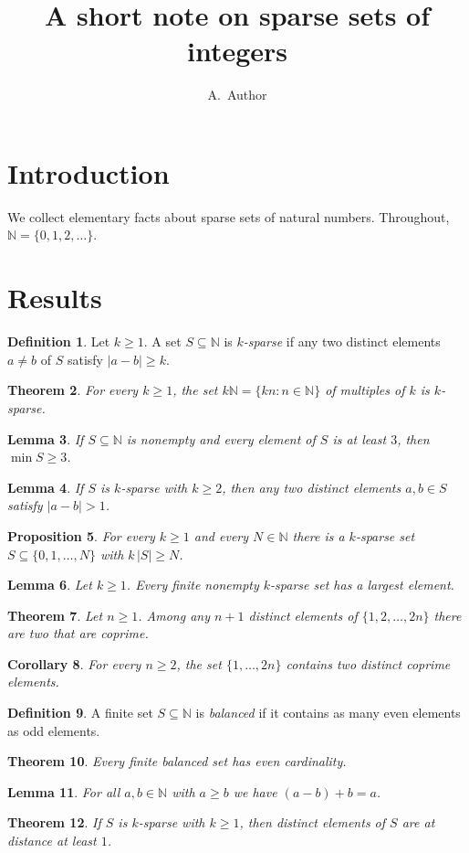 \documentclass[11pt]{article}
\title{A short note on sparse sets of integers}
\author{A.~Author}
\date{}
\newtheorem{theorem}{Theorem}[section]
\newtheorem{lemma}[theorem]{Lemma}
\newtheorem{proposition}[theorem]{Proposition}
\newtheorem{corollary}[theorem]{Corollary}
\theoremstyle{definition}
\newtheorem{definition}[theorem]{Definition}
\begin{document}
\maketitle
\section{Introduction}
We collect elementary facts about sparse sets of natural numbers. Throughout,
$\mathbb{N}=\{0,1,2,\dots\}$.
\section{Results}
\begin{definition}\label{def:sparse}
Let $k\ge 1$. A set $S\subseteq\mathbb{N}$ is \emph{$k$-sparse} if any two distinct
elements $a\neq b$ of $S$ satisfy $|a-b|\ge k$.
\end{definition}
\begin{theorem}\label{thm:multiples}
For every $k\ge 1$, the set $k\mathbb{N}=\{kn : n\in\mathbb{N}\}$ of multiples of $k$ is $k$-sparse.
\end{theorem}
\begin{lemma}\label{lem:min}
If $S\subseteq\mathbb{N}$ is nonempty and every element of $S$ is at least $3$, then $\min S\ge 3$.
\end{lemma}
\begin{lemma}\label{lem:gap}
If $S$ is $k$-sparse with $k\ge 2$, then any two distinct elements $a,b\in S$ satisfy $|a-b|>1$.
\end{lemma}
\begin{proposition}\label{prop:exist}
For every $k\ge 1$ and every $N\in\mathbb{N}$ there is a $k$-sparse set $S\subseteq\{0,1,\dots,N\}$
with $k\,|S|\ge N$.
\end{proposition}
\begin{lemma}\label{lem:max}
Let $k\ge1$. Every finite nonempty $k$-sparse set has a largest element.
\end{lemma}
\begin{theorem}\label{thm:coprime}
Let $n\ge1$. Among any $n+1$ distinct elements of $\{1,2,\dots,2n\}$ there are two that are coprime.
\end{theorem}
\begin{corollary}\label{cor:two}
For every $n\ge 2$, the set $\{1,\dots,2n\}$ contains two distinct coprime elements.
\end{corollary}
\begin{definition}\label{def:balanced}
A finite set $S\subseteq\mathbb{N}$ is \emph{balanced} if it contains as many even elements as odd elements.
\end{definition}
\begin{theorem}\label{thm:balanced}
Every finite balanced set has even cardinality.
\end{theorem}
\begin{lemma}\label{lem:sub}
For all $a,b\in\mathbb{N}$ with $a\ge b$ we have $(a-b)+b=a$.
\end{lemma}
\begin{theorem}\label{thm:control}
If $S$ is $k$-sparse with $k\ge1$, then distinct elements of $S$ are at distance at least $1$.
\end{theorem}
\end{document}
